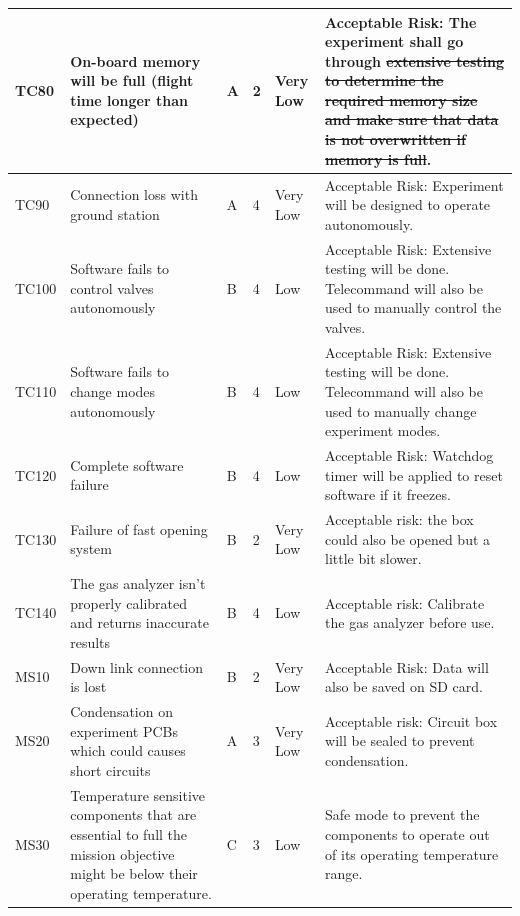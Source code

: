 \documentclass[a4paper,12pt,twoside]{article}
\providecommand{\DIFaddtex}[1]{{\protect\color{blue}\uwave{#1}}} %
\providecommand{\DIFdeltex}[1]{{\protect\color{red}\sout{#1}}}                      %
\providecommand{\DIFaddbegin}{} %
\providecommand{\DIFaddend}{} %
\providecommand{\DIFdelbegin}{} %
\providecommand{\DIFdelend}{} %
\providecommand{\DIFadd}[1]{\texorpdfstring{\DIFaddtex{#1}}{#1}} %
\providecommand{\DIFdel}[1]{\texorpdfstring{\DIFdeltex{#1}}{}} %
\newcommand{\DIFscaledelfig}{0.5}
\newlength{\DIFdelgraphicswidth} %
\newlength{\DIFdelgraphicsheight} %
\newcommand{\DIFaddincludegraphics}[2][]{{\color{blue}\fbox{\DIFOincludegraphics[#1]{#2}}}} %
\newcommand{\DIFdelincludegraphics}[2][]{%
\sbox{\DIFdelgraphicsbox}{\DIFOincludegraphics[#1]{#2}}%
\settoboxwidth{\DIFdelgraphicswidth}{\DIFdelgraphicsbox} %
\settoboxtotalheight{\DIFdelgraphicsheight}{\DIFdelgraphicsbox} %
\scalebox{\DIFscaledelfig}{%
\parbox[b]{\DIFdelgraphicswidth}{\usebox{\DIFdelgraphicsbox}\\[-\baselineskip] \rule{\DIFdelgraphicswidth}{0em}}\llap{\resizebox{\DIFdelgraphicswidth}{\DIFdelgraphicsheight}{%
\setlength{\unitlength}{\DIFdelgraphicswidth}%
\begin{picture}(1,1)%
\thicklines\linethickness{2pt} %
{\color[rgb]{1,0,0}\put(0,0){\framebox(1,1){}}}%
{\color[rgb]{1,0,0}\put(0,0){\line( 1,1){1}}}%
{\color[rgb]{1,0,0}\put(0,1){\line(1,-1){1}}}%
\end{picture}%
}\hspace*{3pt}}} %
} %
\DeclareRobustCommand{\DIFaddbegin}{\DIFOaddbegin \let\includegraphics\DIFaddincludegraphics} %
\DeclareRobustCommand{\DIFaddend}{\DIFOaddend \let\includegraphics\DIFOincludegraphics} %
\DeclareRobustCommand{\DIFdelbegin}{\DIFOdelbegin \let\includegraphics\DIFdelincludegraphics} %
\DeclareRobustCommand{\DIFdelend}{\DIFOaddend \let\includegraphics\DIFOincludegraphics} %
\begin{document}
\begin{landscape}
\begin{longtable}{|m{}| m{} |m{} |m{}|m{}| m{}|}
TC80 & On-board memory will be full (flight time longer than expected) & A & 2 & \cellcolor[HTML]{34FF34}Very Low & Acceptable Risk: The experiment shall go through \DIFdelbegin \DIFdel{extensive testing to determine the required memory size and make sure that data is not overwritten if memory is full}\DIFdelend \DIFaddbegin \DIFadd{testing and analysis to guarantee the onboard memory size is sufficient}\DIFaddend .\\ \hline
TC90 & Connection loss with ground station & A & 4 & \cellcolor[HTML]{34FF34}Very Low & Acceptable Risk: Experiment will be designed to operate autonomously. \\ \hline
TC100 & Software fails to control valves autonomously & B & 4 & \cellcolor[HTML]{FCFF2F}Low & Acceptable Risk: Extensive testing will be done. Telecommand will also be used to manually control the valves. \\ \hline
TC110 & Software fails to change modes autonomously & B & 4 & \cellcolor[HTML]{FCFF2F}Low & Acceptable Risk: Extensive testing will be done. Telecommand will also be used to manually change experiment modes. \\ \hline
TC120 & Complete software failure & B & 4 & \cellcolor[HTML]{FCFF2F}Low & Acceptable Risk: Watchdog timer will be applied to reset software if it freezes. \\ \hline
TC130 & Failure of fast opening system & B & 2 & \cellcolor[HTML]{34FF34}Very Low & Acceptable risk: the box could also be opened but a little bit slower. \\ \hline
TC140 & The gas analyzer isn't properly calibrated and returns inaccurate results & B & 4 & \cellcolor[HTML]{FCFF2F}Low & Acceptable risk: Calibrate the gas analyzer before use.\\ \hline
MS10 & Down link connection is lost \DIFaddbegin \DIFadd{prematurely }\DIFaddend & B & 2 & \cellcolor[HTML]{34FF34}Very Low & Acceptable Risk: Data will also be saved on SD card. \\ \hline
MS20 & Condensation on experiment PCBs which could causes short circuits & A & 3 & \cellcolor[HTML]{34FF34}Very Low & Acceptable risk: Circuit box will be sealed to prevent condensation. \\ \hline
MS30 & Temperature sensitive components that are essential to full the mission objective might be below their operating temperature. & C & 3 & \cellcolor[HTML]{FCFF2F}Low & Safe mode to prevent the components to operate out of its operating temperature range. \\ \hline

\end{longtable}
\end{landscape}
\end{document}
